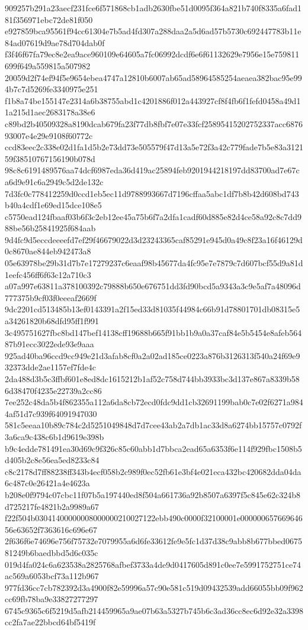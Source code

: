 {909257b291a23aecf231fce6f571868cb1adb2630fbe51d0095f364a821b740f8335a6fad181f356971ebc72de81f050
e927859bca95561f94cc61304e7b5ad4fd307a288daa2a5d6ad57b5730c692447783b11e84ad07619d9ae78d704dab0f
f3f46f67fa79ec8e2ea9ace960109e64605a7fc06992dcdf6e6f61132629e7956e15e759811699f649a559815a507982
20059d2f74ef94f5e9654ebea4747a12810b6007ab65ad58964585254aeaea382bac95e994b7c7d5269fe3340975e251
f1b8a74be155147e2314a6b38755abd1c4201886f012a443927cf8f4fb6f1fefd0458a49d11a215d1aec2683178a38e6
c89bd2b40509328a8190dcab679fa23f77db8fbf7e07e33fcf25895415202752337acc687693007e4e29e9108f60772c
ccd83eec2c338e02d1fa1d5b2e73dd73e505579f47d13a5e72f3a42c779fade7b5e83a312159f38510767156190b078d
98c8c6191489576aa74dcf6987eda36d419ac25894feb9201944218197dd83700ad7e67ca6d9e91c6a2949c5d2de132c
7d3fc0c778412259d0ccd1eb5ec11d9788993667d7196cffaa5abc1df7b8b42d608bd743b40a4cdf1e69ed15dce108e5
c5750ead124fbaaf03b6f3c2eb12ee45a75b6f7a2dfa1cadf60d885e82d4ce58a92c8c7dd988be56b25841925f684aab
9d4fc9d5eccdeeeefd7ef29f46679022d3d23243365caf85291e945d0a49c8f23a16f46129d0c8670ae844eb942473a8
05e63978be29b31d7b7e17279237c6eaaf98b45677da4fc95e7e7879c7d607bcf55d9a81d1eefc456ff6f63c12a710c3
a07a997e63811a378100392c79888b650e676751dd3fd90bcd5a9343a3c9e5af7a48096d777375b9cf03f0eeeaf2669f
9dc2201cd513485b13ef0143391a2f15ed33d81035f44984c66b91d78801701db08315e5a34261820b68dfd95ff1f991
3c495751627fbc8bd147bef14138cff19688b665f91bb1b9a0a37caf84e5b5454e8afeb56487b91ecc3022ede93e9aaa
925ad40ba96ccd9cc949e21d3afab8cf0a2a02ad185ce0223a876b3126313f540a24f69e932373dde2ae1157ef7fde4c
2da488d3b5c3ffbf601e8ed8dc1615212b1af52c758d744bb3933bc3d137e867a8339b586d38470f4235e22739a2cc86
7ee252c48da5b4f862355a112a6da8cb72ecd0fdc9dd1cb32691199bab0c7e02f6271a9844af51d7c939f64091947030
581c5eeaa10b89c784c2d5251049848d7d7cee43ab2a7db1ac33d8a6274bb15757c0792f3a6ca9c438c6b1d9619e398b
b9c4edde781491ea30d69c9f326c85c60abb1d7bbca2ead65a6353f6e114f929fbc1508b5d405b2c8e56ea5ed8233c84
c8c2178d7ff88238ff343b4ecf058b2c989f0ec52fb61e3bf4e021eca432bc420682dda04da6c487c0e26421a4e4623a
b208e0f9794c07cbc11f07b5a197440ed8f504a661736a92b8507a6397f5c845e62c324b8d725217fe4821b2a9989a67
f22f504b03041400000008000000210027122ebb490c0000f32100001e00000065766964656e63652f7363616c696e67
2f636f6e74696e756f75732e7079955a6d6fe33612fe9e5fc1d37d38c9abb8b677bbed067581249b6baedbbd5d6c035c
019d4fa024c6a623538a2825768afbef3733a4de9d0417605d891c0ee7e5991752751ce74ac569a6053bcf73a112b967
977fd36cc7cb782392d3a4900f82e59996a57c90e581c519d09432539add66055bb09f962cc69fb78ba9e33827277297
6745c9365c6f5219d5afb214459965a9ae07b63a5327b745b6c3ad36cc8ec6d92e32a3398cc2fa7ae22bbcd64bf5419f
}
